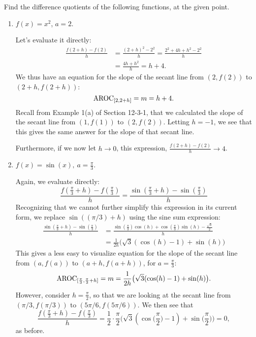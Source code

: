 \documentclass{ximera}
\begin{document}
\begin{example}
  Find the difference quotients of the following functions, at the given point. 
  \begin{enumerate}[label=\alph*.]
  \item $f(x)=x^2$, $a=2$.

    \begin{explanation}
      Let's evaluate it directly:
      \begin{align*}
        \frac{f(2+h)-f(2)}{h} &= \frac{(2+h)^2-2^2}{h} = \frac{2^2+4h+h^2-2^2}{h} \\ &= \frac{4h+h^2}{h} = h+4.
      \end{align*}
      We thus have an equation for the slope of the secant line from $(2,f(2))$ to $(2+h,f(2+h))$: 
      $$\mathrm{AROC}_{[2,2+h]}= m = h+4.$$
      Recall from Example 1(a) of Section 12-3-1, that we calculated the slope of the secant line from $(1,f(1))$ to $(2,f(2))$. Letting $h=-1$, we see that this gives the same answer for the slope of that secant line.
      
      Furthermore, if we now let $h \rightarrow 0$, this expression, $\frac{f(2+h)-f(2)}{h} \rightarrow 4$.
    \end{explanation}
    
  \item $f(x) = \sin (x), \ a =\frac{\pi}{3}$.\\
  \begin{explanation}
  Again, we evaluate directly:
  \begin{equation*}
   \frac{f(\frac{\pi}{3} + h) - f(\frac{\pi}{3})}{h} = \frac{\sin(\frac{\pi}{3} +h) - \sin (\frac{\pi}{3})}{h}
  \end{equation*}
  Recognizing that we cannot further simplify this expression in its current form, we replace $\sin((\pi/3) +h)$ using the sine sum expression:
  \begin{align*}
  \frac{\sin(\frac{\pi}{3} +h) - \sin (\frac{\pi}{3})}{h} 
  &= \frac{\sin(\frac{\pi}{3})\cos (h) + \cos(\frac{\pi}{3}) \sin( h) - \frac{\sqrt{3}}{2}}{h} \\
  &= \frac{1}{2h}\big(\sqrt{3}(\cos (h) -1) + \sin( h)\big)
  \end{align*}
  This gives a less easy to visualize equation for the slope of the secant line from $(a,f(a))$ to $(a+h,f(a+h))$, for $a=\frac{\pi}{3}$: 
  $$\mathrm{AROC}_{[\frac{\pi}{3},\frac{\pi}{3}+h]}= m =\frac{1}{2h}\big(\sqrt{3}(\cos (h) -1) + \sin( h)\big).$$ 
  However, consider $h=\frac{\pi}{2}$, so that we are looking at the secant line from $(\pi/3, f(\pi/3))$ to $(5\pi/6, f(5\pi/6))$. We then see that 
  $$ \frac{f(\frac{\pi}{3} + h) - f(\frac{\pi}{3})}{h} = \frac{1}{2} \cdot \frac{\pi}{2}\big(\sqrt{3}(\cos\Big(\frac{\pi}{2}\Big) -1)+ \sin\Big(\frac{\pi}{2}\Big) \big)= 0,$$
 as before.
 

\end{explanation}
\end{enumerate}
\end{example}
\end{document}
